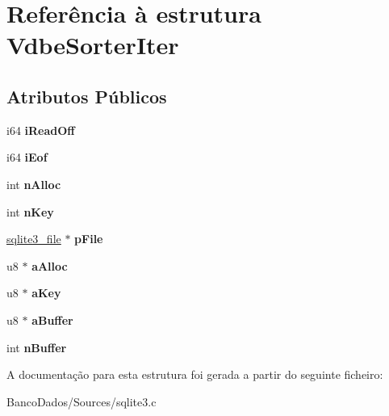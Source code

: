 \hypertarget{struct_vdbe_sorter_iter}{\section{Referência à estrutura Vdbe\-Sorter\-Iter}
\label{struct_vdbe_sorter_iter}
}
\subsection*{Atributos Públicos}
\begin{DoxyCompactItemize}
\item 
\hypertarget{struct_vdbe_sorter_iter_a3a02adf412dd2af1022d3d5f95aee180}{i64 {\bfseries i\-Read\-Off}}\label{struct_vdbe_sorter_iter_a3a02adf412dd2af1022d3d5f95aee180}

\item 
\hypertarget{struct_vdbe_sorter_iter_a017704dcc972c2d246414290e0a7ac81}{i64 {\bfseries i\-Eof}}\label{struct_vdbe_sorter_iter_a017704dcc972c2d246414290e0a7ac81}

\item 
\hypertarget{struct_vdbe_sorter_iter_a1e2eeb598b3709bca999e96e42163783}{int {\bfseries n\-Alloc}}\label{struct_vdbe_sorter_iter_a1e2eeb598b3709bca999e96e42163783}

\item 
\hypertarget{struct_vdbe_sorter_iter_a6c73b1e17f13a83fa99c21ab5fc4cf2b}{int {\bfseries n\-Key}}\label{struct_vdbe_sorter_iter_a6c73b1e17f13a83fa99c21ab5fc4cf2b}

\item 
\hypertarget{struct_vdbe_sorter_iter_ac6487cb536e6a3ba6209a5446b4ce0b0}{\hyperlink{structsqlite3__file}{sqlite3\-\_\-file} $\ast$ {\bfseries p\-File}}\label{struct_vdbe_sorter_iter_ac6487cb536e6a3ba6209a5446b4ce0b0}

\item 
\hypertarget{struct_vdbe_sorter_iter_a093de2f50db1cb5f84c6b9194dcc981b}{u8 $\ast$ {\bfseries a\-Alloc}}\label{struct_vdbe_sorter_iter_a093de2f50db1cb5f84c6b9194dcc981b}

\item 
\hypertarget{struct_vdbe_sorter_iter_ae3f5248ba23036136e11d3c6d067f485}{u8 $\ast$ {\bfseries a\-Key}}\label{struct_vdbe_sorter_iter_ae3f5248ba23036136e11d3c6d067f485}

\item 
\hypertarget{struct_vdbe_sorter_iter_a1be5dd1cf24f36af4ba56e3dc5f55e1f}{u8 $\ast$ {\bfseries a\-Buffer}}\label{struct_vdbe_sorter_iter_a1be5dd1cf24f36af4ba56e3dc5f55e1f}

\item 
\hypertarget{struct_vdbe_sorter_iter_a9c91dda70d7b50b7f661f2ed84462fc2}{int {\bfseries n\-Buffer}}\label{struct_vdbe_sorter_iter_a9c91dda70d7b50b7f661f2ed84462fc2}

\end{DoxyCompactItemize}


A documentação para esta estrutura foi gerada a partir do seguinte ficheiro\-:\begin{DoxyCompactItemize}
\item 
Banco\-Dados/\-Sources/sqlite3.\-c\end{DoxyCompactItemize}
